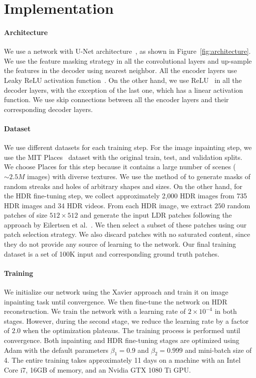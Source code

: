 \section{Implementation}
\label{sec:architecture}

\paragraph{Architecture}
We use a network with U-Net architecture~\cite{ronneberger2015u}, as shown in Figure~\ref{fig:architecture}. We use the feature masking strategy in all the convolutional layers and up-sample the features in the decoder using nearest neighbor. All the encoder layers use Leaky ReLU activation function~\cite{maas2013rectifier}. On the other hand, we use ReLU~\cite{nair2010rectified} in all the decoder layers, with the exception of the last one, which has a linear activation function. We use skip connections between all the encoder layers and their corresponding decoder layers.

\paragraph{Dataset}
We use different datasets for each training step. For the image inpainting step, we use the MIT Places~\cite{zhou2014learning} dataset with the original train, test, and validation splits. We choose Places for this step because it contains a large number of scenes ($\sim 2.5M$ images) with diverse textures. We use the method of \citet{liu2018image} to generate masks of random streaks and holes of arbitrary shapes and sizes. On the other hand, for the HDR fine-tuning step, we collect approximately 2,000 HDR images from 735 HDR images and 34 HDR videos. From each HDR image, we extract $250$ random patches of size $512 \times 512$ and generate the input LDR patches following the approach by Eilertsen et al.~. We then select a subset of these patches using our patch selection strategy. We also discard patches with no saturated content, since they do not provide any source of learning to the network. Our final training dataset is a set of 100K input and corresponding ground truth patches.

\vspace{-0.15pt}
\paragraph{Training}
We initialize our network using the Xavier approach \cite{glorot2010understanding} and train it on image inpainting task until convergence. We then fine-tune the network on HDR reconstruction. We train the network with a learning rate of $ 2 \times 10^{-4} $ in both stages. However, during the second stage, we reduce the learning rate by a factor of $2.0$ when the optimization plateaus. The training process is performed until convergence. Both inpainting and HDR fine-tuning stages are optimized using Adam \cite{kingma2014adam} with the default parameters $\beta_1 = 0.9$ and $\beta_2 = 0.999$ and mini-batch size of 4. The entire training takes approximately 11 days on a machine with an Intel Core i7, 16GB of memory, and an Nvidia GTX 1080 Ti GPU. 

